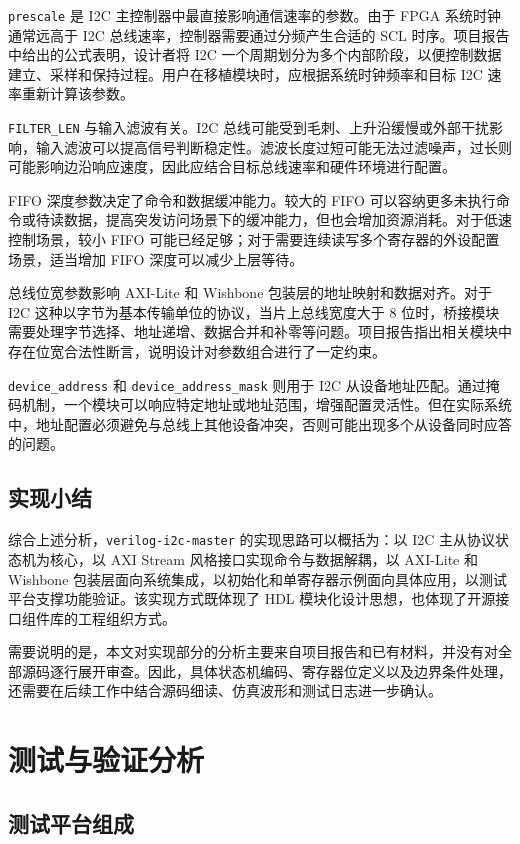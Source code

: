 \documentclass[12pt,a4paper]{article}
\numberwithin{equation}{section}
\begin{document}
\texttt{prescale} 是 I2C 主控制器中最直接影响通信速率的参数。由于 FPGA 系统时钟通常远高于 I2C 总线速率，控制器需要通过分频产生合适的 SCL 时序。项目报告中给出的公式表明，设计者将 I2C 一个周期划分为多个内部阶段，以便控制数据建立、采样和保持过程。用户在移植模块时，应根据系统时钟频率和目标 I2C 速率重新计算该参数。

\texttt{FILTER\_LEN} 与输入滤波有关。I2C 总线可能受到毛刺、上升沿缓慢或外部干扰影响，输入滤波可以提高信号判断稳定性。滤波长度过短可能无法过滤噪声，过长则可能影响边沿响应速度，因此应结合目标总线速率和硬件环境进行配置。

FIFO 深度参数决定了命令和数据缓冲能力。较大的 FIFO 可以容纳更多未执行命令或待读数据，提高突发访问场景下的缓冲能力，但也会增加资源消耗。对于低速控制场景，较小 FIFO 可能已经足够；对于需要连续读写多个寄存器的外设配置场景，适当增加 FIFO 深度可以减少上层等待。

总线位宽参数影响 AXI-Lite 和 Wishbone 包装层的地址映射和数据对齐。对于 I2C 这种以字节为基本传输单位的协议，当片上总线宽度大于 8 位时，桥接模块需要处理字节选择、地址递增、数据合并和补零等问题。项目报告指出相关模块中存在位宽合法性断言，说明设计对参数组合进行了一定约束。

\texttt{device\_address} 和 \texttt{device\_address\_mask} 则用于 I2C 从设备地址匹配。通过掩码机制，一个模块可以响应特定地址或地址范围，增强配置灵活性。但在实际系统中，地址配置必须避免与总线上其他设备冲突，否则可能出现多个从设备同时应答的问题。

\subsection{实现小结}

综合上述分析，\texttt{verilog-i2c-master} 的实现思路可以概括为：以 I2C 主从协议状态机为核心，以 AXI Stream 风格接口实现命令与数据解耦，以 AXI-Lite 和 Wishbone 包装层面向系统集成，以初始化和单寄存器示例面向具体应用，以测试平台支撑功能验证。该实现方式既体现了 HDL 模块化设计思想，也体现了开源接口组件库的工程组织方式。

需要说明的是，本文对实现部分的分析主要来自项目报告和已有材料，并没有对全部源码逐行展开审查。因此，具体状态机编码、寄存器位定义以及边界条件处理，还需要在后续工作中结合源码细读、仿真波形和测试日志进一步确认。

\clearpage
\section{测试与验证分析}

\subsection{测试平台组成}
\end{document}
